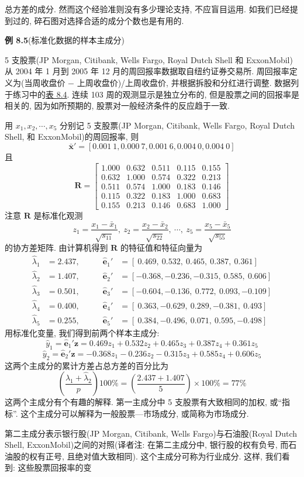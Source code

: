 
总方差的成分. 然而这个经验准则没有多少理论支持, 不应盲目运用. 如我们已经提到过的, 碎石图对选择合适的成分个数也是有用的.

\noindent\textbf{例 8.5}\quad (标准化数据的样本主成分)

5 支股票(JP Morgan, Citibank, Wells Fargo, Royal Dutch Shell 和 ExxonMobil)从 2004 年 1 月到 2005 年 12 月的周回报率数据取自纽约证券交易所. 周回报率定义为(当周收盘价 $-$ 上周收盘价)/上周收盘价, 并根据拆股和分红进行调整. 数据列于练习中的\hyperref[tab:8.4]{表 8.4}. 连续 103 周的观测显示是独立分布的, 但是股票之间的回报率是相关的, 因为如所预期的, 股票对一般经济条件的反应趋于一致.

用 $x_1,x_2,\cdots,x_5$ 分别记 5 支股票(JP Morgan, Citibank, Wells Fargo, Royal Dutch Shell, 和 ExxonMobil)的周回报率, 则
\[
\bar{\mathbf{x}}'=[0.001\ 1,0.000\ 7,0.001\ 6,0.004\ 0,0.004\ 0]
\]
且
\[
\mathbf{R}=\begin{bmatrix}
1.000&0.632&0.511&0.115&0.155\\
0.632&1.000&0.574&0.322&0.213\\
0.511&0.574&1.000&0.183&0.146\\
0.115&0.322&0.183&1.000&0.683\\
0.155&0.213&0.146&0.683&1.000
\end{bmatrix}
\]
注意 $\mathbf{R}$ 是标准化观测
\[
z_1=\frac{x_1-\bar{x}_1}{\sqrt{s_{11}}},\ z_2=\frac{x_2-\bar{x}_2}{\sqrt{s_{22}}},\ \cdots,\ z_5=\frac{x_5-\bar{x}_5}{\sqrt{s_{55}}}
\]
的协方差矩阵. 由计算机得到 $\mathbf{R}$ 的特征值和特征向量为
\[
\begin{aligned}
\hat{\lambda}_1&=2.437,&\qquad \hat{\mathbf{e}}_1'&=[\ 0.469,\ 0.532,\ 0.465,\ 0.387,\ 0.361]\\
\hat{\lambda}_2&=1.407,&\qquad \hat{\mathbf{e}}_2'&=[-0.368,-0.236,-0.315,\ 0.585,\ 0.606]\\
\hat{\lambda}_3&=0.501,&\qquad \hat{\mathbf{e}}_3'&=[-0.604,-0.136,\ 0.772,\ 0.093,-0.109]\\
\hat{\lambda}_4&=0.400,&\qquad \hat{\mathbf{e}}_4'&=[\ 0.363,-0.629,\ 0.289,-0.381,\ 0.493]\\
\hat{\lambda}_5&=0.255,&\qquad \hat{\mathbf{e}}_5'&=[\ 0.384,-0.496,\ 0.071,\ 0.595,-0.498]
\end{aligned}
\]
用标准化变量, 我们得到前两个样本主成分:
\[
\hat{y}_1=\hat{\mathbf{e}}_1'\mathbf{z}=0.469z_1+0.532z_2+0.465z_3+0.387z_4+0.361z_5
\]
\[
\hat{y}_2=\hat{\mathbf{e}}_2'\mathbf{z}=-0.368z_1-0.236z_2-0.315z_3+0.585z_4+0.606z_5
\]
这两个主成分的累计方差占总方差的百分比为
\[
\left(\frac{\hat{\lambda}_1+\hat{\lambda}_2}{p}\right)100\%=\left(\frac{2.437+1.407}{5}\right)\times 100\%=77\%
\]
这两个主成分有个有趣的解释. 第一主成分中 5 支股票有大致相同的加权, 或“指标”. 这个主成分可以解释为一般股票—市场成分, 或简称为市场成分.

第二主成分表示银行股(JP Morgan, Citibank, Wells Fargo)与石油股(Royal Dutch Shell, ExxonMobil)之间的对照(译者注: 在第二主成分中, 银行股的权有负号, 而石油股的权有正号, 且绝对值大致相同). 这个主成分可称为行业成分. 这样, 我们看到: 这些股票回报率的变
